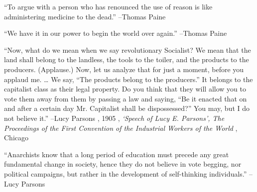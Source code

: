 \documentclass{article}%
\begin{document}
\linebreak%
\vspace{1mm}%
\begin{minipage}{\textwidth}%
\flushleft%
“To argue with a person who has renounced the use of reason is like administering medicine to the dead.”%
\linebreak%
\vspace{1mm}%
–Thomas Paine%
\linebreak%
\vspace{1mm}%
\end{minipage}%
\linebreak%
\vspace{1mm}%
\begin{minipage}{\textwidth}%
\flushleft%
“We have it in our power to begin the world over again.”%
\linebreak%
\vspace{1mm}%
–Thomas Paine%
\linebreak%
\vspace{1mm}%
\end{minipage}%
\linebreak%
\vspace{1mm}%
\begin{minipage}{\textwidth}%
\flushleft%
“Now, what do we mean when we say revolutionary Socialist? We mean that the land shall belong to the landless, the tools to the toiler, and the products to the producers. (Applause.) Now, let us analyze that for just a moment, before you applaud me. … We say, “The products belong to the producers.” It belongs to the capitalist class as their legal property. Do you think that they will allow you to vote them away from them by passing a law and saying, “Be it enacted that on and after a certain day Mr. Capitalist shall be dispossessed?” You may, but I do not believe it.”%
\linebreak%
\vspace{1mm}%
–Lucy Parsons%
, 1905%
, \textit{‘Speech of Lucy E. Parsons’, The Proceedings of the First Convention of the Industrial Workers of the World}%
, Chicago%
\linebreak%
\vspace{1mm}%
\end{minipage}%
\linebreak%
\vspace{1mm}%
\begin{minipage}{\textwidth}%
\flushleft%
“Anarchists know that a long period of education must precede any great fundamental change in society, hence they do not believe in vote begging, nor political campaigns, but rather in the development of self{-}thinking individuals.”%
\linebreak%
\vspace{1mm}%
–Lucy Parsons%
\linebreak%
\vspace{1mm}%
\end{minipage}%
\end{document}
